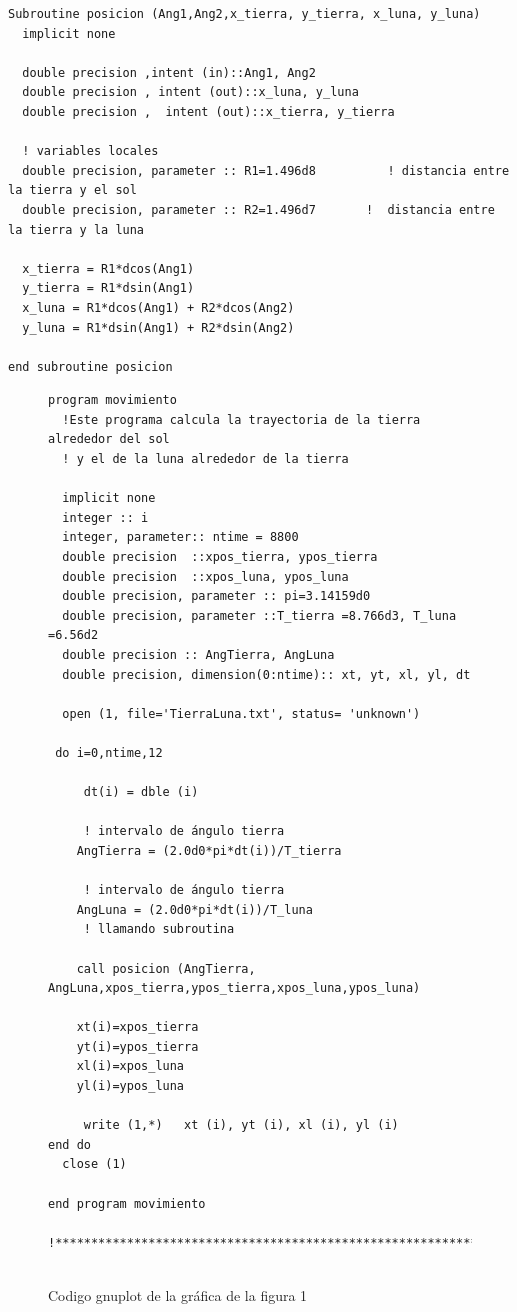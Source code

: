 \documentclass[12pt,a4paper,twoside]{article}
\begin{document}
\begin{verbatim}
Subroutine posicion (Ang1,Ang2,x_tierra, y_tierra, x_luna, y_luna)
  implicit none
  
  double precision ,intent (in)::Ang1, Ang2
  double precision , intent (out)::x_luna, y_luna
  double precision ,  intent (out)::x_tierra, y_tierra
  
  ! variables locales 
  double precision, parameter :: R1=1.496d8          ! distancia entre la tierra y el sol
  double precision, parameter :: R2=1.496d7       !  distancia entre la tierra y la luna
     
  x_tierra = R1*dcos(Ang1)
  y_tierra = R1*dsin(Ang1)
  x_luna = R1*dcos(Ang1) + R2*dcos(Ang2)
  y_luna = R1*dsin(Ang1) + R2*dsin(Ang2)

end subroutine posicion
\end{verbatim}

\begin{figure}[h]
\begin{verbatim}
program movimiento
  !Este programa calcula la trayectoria de la tierra alrededor del sol
  ! y el de la luna alrededor de la tierra
  
  implicit none
  integer :: i
  integer, parameter:: ntime = 8800
  double precision  ::xpos_tierra, ypos_tierra
  double precision  ::xpos_luna, ypos_luna
  double precision, parameter :: pi=3.14159d0
  double precision, parameter ::T_tierra =8.766d3, T_luna =6.56d2 
  double precision :: AngTierra, AngLuna
  double precision, dimension(0:ntime):: xt, yt, xl, yl, dt

  open (1, file='TierraLuna.txt', status= 'unknown')
 
 do i=0,ntime,12
     
     dt(i) = dble (i)
     
     ! intervalo de ángulo tierra
    AngTierra = (2.0d0*pi*dt(i))/T_tierra

     ! intervalo de ángulo tierra
    AngLuna = (2.0d0*pi*dt(i))/T_luna
     ! llamando subroutina 

    call posicion (AngTierra, AngLuna,xpos_tierra,ypos_tierra,xpos_luna,ypos_luna)
    
    xt(i)=xpos_tierra
    yt(i)=ypos_tierra
    xl(i)=xpos_luna
    yl(i)=ypos_luna
    
     write (1,*)   xt (i), yt (i), xl (i), yl (i)
end do
  close (1)

end program movimiento

!************************************************************************************
   
\end{verbatim}
\caption{Codigo gnuplot de la gráfica de la figura 1}
\label{fig:figura3}
\end{figure}
\end{document}
